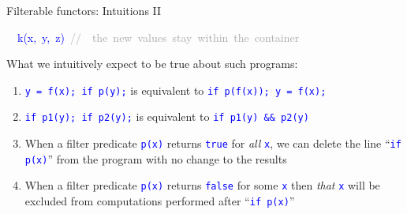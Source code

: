 \documentclass[english]{beamer}
\newenvironment{lyxcode}
   {\par\begin{list}{}{
     \setlength{\rightmargin}{\leftmargin}
     \setlength{\listparindent}{0pt}%
     \raggedright
     \setlength{\itemsep}{0pt}
     \setlength{\parsep}{0pt}
     \normalfont\ttfamily}%
    \def\{{\char`\{}
    \def\}{\char`\}}
    \def\textasciitilde{\char`\~}
    \item[]}
   {\end{list}}
\begin{document}
\begin{frame}{Filterable functors: Intuitions II}
\begin{itemize}
\begin{lyxcode}
\textcolor{blue}{\footnotesize{}~~k(x,~y,~z)~}\textrm{\textcolor{darkgray}{\footnotesize{}//~~the~new~values~stay~within~the~container}}{\footnotesize \par}
\end{lyxcode}
\item What we intuitively expect to be true about such programs:
\begin{enumerate}
\item \texttt{\textcolor{blue}{\footnotesize{}y = f(x); if p(y);}} is equivalent
to \texttt{\textcolor{blue}{\footnotesize{}if p(f(x)); y = f(x);}} 
\item \texttt{\textcolor{blue}{\footnotesize{}if p1(y); if p2(y);}} is equivalent
to \texttt{\textcolor{blue}{\footnotesize{}if p1(y) \&\& p2(y)}} 
\item When a filter predicate \texttt{\textcolor{blue}{\footnotesize{}p(x)}}
returns \texttt{\textcolor{blue}{\footnotesize{}true}} for \emph{all}
\texttt{\textcolor{blue}{\footnotesize{}x}}, we can delete the line
``\texttt{\textcolor{blue}{\footnotesize{}if p(x)}}'' from the program
with no change to the results
\item When a filter predicate \texttt{\textcolor{blue}{\footnotesize{}p(x)}}
returns \texttt{\textcolor{blue}{\footnotesize{}false}} for some \texttt{\textcolor{blue}{\footnotesize{}x}}
then\emph{ that} \texttt{\textcolor{blue}{\footnotesize{}x}} will
be excluded from computations performed after ``\texttt{\textcolor{blue}{\footnotesize{}if
p(x)}}''
\end{enumerate}
\end{itemize}
\end{frame}
\end{document}
